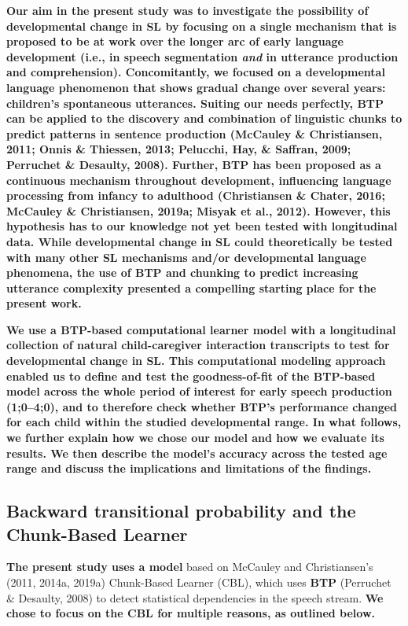 \documentclass[
  english,
  man,mask,floatsintext]{apa6}
\begin{document}
\textbf{Our aim in the present study was to investigate the possibility of developmental change in SL by focusing on a single mechanism that is proposed to be at work over the longer arc of early language development (i.e., in speech segmentation \emph{and} in utterance production and comprehension). Concomitantly, we focused on a developmental language phenomenon that shows gradual change over several years: children's spontaneous utterances. Suiting our needs perfectly, BTP can be applied to the discovery and combination of linguistic chunks to predict patterns in sentence production (McCauley \& Christiansen, 2011; Onnis \& Thiessen, 2013; Pelucchi, Hay, \& Saffran, 2009; Perruchet \& Desaulty, 2008). Further, BTP has been proposed as a continuous mechanism throughout development, influencing language processing from infancy to adulthood (Christiansen \& Chater, 2016; McCauley \& Christiansen, 2019a; Misyak et al., 2012). However, this hypothesis has to our knowledge not yet been tested with longitudinal data. While developmental change in SL could theoretically be tested with many other SL mechanisms and/or developmental language phenomena, the use of BTP and chunking to predict increasing utterance complexity presented a compelling starting place for the present work.}

\textbf{We use a BTP-based computational learner model with a longitudinal collection of natural child-caregiver interaction transcripts to test for developmental change in SL. This computational modeling approach enabled us to define and test the goodness-of-fit of the BTP-based model across the whole period of interest for early speech production (1;0--4;0), and to therefore check whether BTP's performance changed for each child within the studied developmental range. In what follows, we further explain how we chose our model and how we evaluate its results. We then describe the model's accuracy across the tested age range and discuss the implications and limitations of the findings.}

\hypertarget{backward-transitional-probability-and-the-chunk-based-learner}{%
\subsection{\texorpdfstring{\textbf{Backward transitional probability} and the Chunk-Based Learner}{Backward transitional probability and the Chunk-Based Learner}}\label{backward-transitional-probability-and-the-chunk-based-learner}}

\textbf{The present study uses a model} based on McCauley and Christiansen's (2011, 2014a, 2019a) Chunk-Based Learner (CBL), which uses \textbf{BTP} (Perruchet \& Desaulty, 2008) to detect statistical dependencies in the speech stream. \textbf{We chose to focus on the CBL for multiple reasons, as outlined below.}
\end{document}
